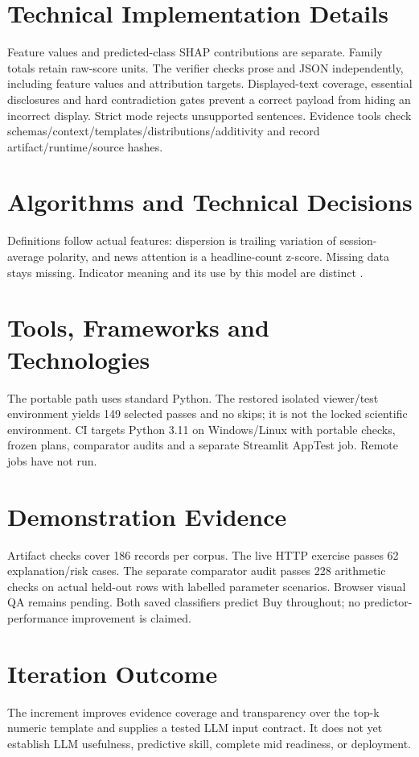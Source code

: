 \section{Technical Implementation Details}
Feature values and predicted-class SHAP contributions are separate. Family totals retain raw-score units. The verifier checks prose and JSON independently, including feature values and attribution targets. Displayed-text coverage, essential disclosures and hard contradiction gates prevent a correct payload from hiding an incorrect display. Strict mode rejects unsupported sentences. Evidence tools check schemas/context/templates/distributions/additivity and record artifact/runtime/source hashes.

\section{Algorithms and Technical Decisions}
Definitions follow actual features: dispersion is trailing variation of session-average polarity, and news attention is a headline-count z-score. Missing data stays missing. Indicator meaning and its use by this model are distinct \cite{fidelity_rsi,fidelity_macd,fidelity_obv}.

\section{Tools, Frameworks and Technologies}
The portable path uses standard Python. The restored isolated viewer/test environment yields 149 selected passes and no skips; it is not the locked scientific environment. CI targets Python 3.11 on Windows/Linux with portable checks, frozen plans, comparator audits and a separate Streamlit AppTest job. Remote jobs have not run.

\section{Demonstration Evidence}
Artifact checks cover 186 records per corpus. The live HTTP exercise passes 62 explanation/risk cases. The separate comparator audit passes 228 arithmetic checks on actual held-out rows with labelled parameter scenarios. Browser visual QA remains pending. Both saved classifiers predict Buy throughout; no predictor-performance improvement is claimed.

\section{Iteration Outcome}
The increment improves evidence coverage and transparency over the top-k numeric template and supplies a tested LLM input contract. It does not yet establish LLM usefulness, predictive skill, complete mid readiness, or deployment.
